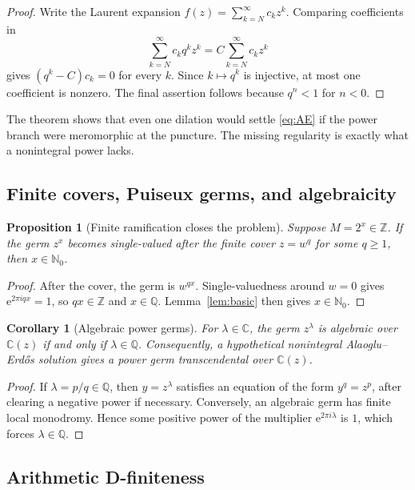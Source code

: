 \documentclass[11pt,oneside]{article}
\newtheorem{proposition}[theorem]{Proposition}
\newtheorem{corollary}[theorem]{Corollary}
\theoremstyle{definition}
\theoremstyle{remark}
\newcommand{\Nzero}{\mathbb N_0}
\newcommand{\Z}{\mathbb Z}
\newcommand{\Q}{\mathbb Q}
\newcommand{\C}{\mathbb C}
\newcommand{\e}{\mathrm e}
\newcommand{\AEconj}{Alaoglu--Erd\H{o}s}
\begin{document}
\begin{proof}
Write the Laurent expansion
\(f(z)=\sum_{k=N}^{\infty}c_kz^k\).  Comparing coefficients in
\[
  \sum_{k=N}^{\infty}c_kq^kz^k
  =C\sum_{k=N}^{\infty}c_kz^k
\]
gives \((q^k-C)c_k=0\) for every \(k\).  Since \(k\mapsto q^k\) is injective, at most one coefficient is nonzero.  The final assertion follows because \(q^n<1\) for \(n<0\).
\end{proof}

The theorem shows that even one dilation would settle \eqref{eq:AE} if the power branch were meromorphic at the puncture.  The missing regularity is exactly what a nonintegral power lacks.

\subsection{Finite covers, Puiseux germs, and algebraicity}

\begin{proposition}[Finite ramification closes the problem]
\label{prop:finite-cover}
Suppose \(M=2^x\in\Z\).  If the germ \(z^x\) becomes single-valued after the finite cover \(z=w^q\) for some \(q\ge1\), then \(x\in\Nzero\).
\end{proposition}

\begin{proof}
After the cover, the germ is \(w^{qx}\).  Single-valuedness around \(w=0\) gives
\(\e^{2\pi i qx}=1\), so \(qx\in\Z\) and \(x\in\Q\).  Lemma~\ref{lem:basic} then gives \(x\in\Nzero\).
\end{proof}

\begin{corollary}[Algebraic power germs]
\label{cor:algebraic-germ}
For \(\lambda\in\C\), the germ \(z^\lambda\) is algebraic over \(\C(z)\) if and only if \(\lambda\in\Q\).  Consequently, a hypothetical nonintegral \AEconj{} solution gives a power germ transcendental over \(\C(z)\).
\end{corollary}

\begin{proof}
If \(\lambda=p/q\in\Q\), then \(y=z^\lambda\) satisfies an equation of the form
\(y^q=z^p\), after clearing a negative power if necessary.  Conversely, an algebraic germ has finite local monodromy.  Hence some positive power of the multiplier \(\e^{2\pi i\lambda}\) is \(1\), which forces \(\lambda\in\Q\).
\end{proof}

\subsection{Arithmetic D-finiteness}
\end{document}
